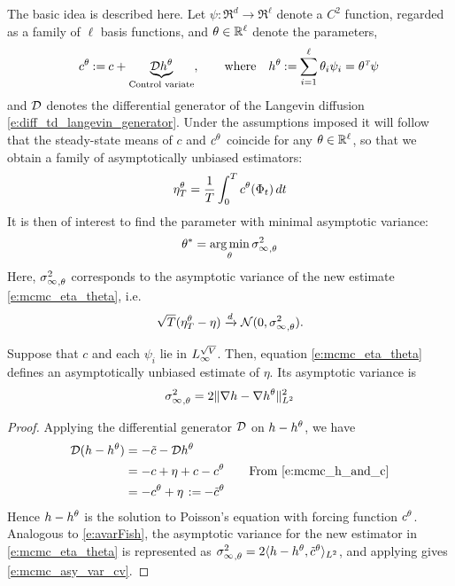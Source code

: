 The basic idea is described here. Let $\psi\colon\Re^d\to\Re^\ell$ denote a $C^2$ function, regarded as a family of $\ell$ basis functions, and $\theta\in\mathbb{R}^\ell$ denote the parameters,
\begin{equation}
\begin{aligned}
c^\param  \eqdef c + \underbrace{\generate h^\param}_{\text{Control variate}},
\qquad
\text{where}
\quad
h^\param  \eqdef  \sum_{i=1}^\ell \param_i \psi_i = \param^\transpose \psi\,
\end{aligned}
\label{e:mcmc_h_and_c}
\end{equation}
and ${\cal D}$ denotes the differential generator of the Langevin diffusion \eqref{e:diff_td_langevin_generator}. 
Under the assumptions imposed it will follow that the steady-state means of $c$ and $c^\theta$ coincide for any $\theta\in\mathbb{R}^\ell$,  so that we obtain a family of asymptotically unbiased estimators: %
\begin{equation}
\eta^\param_T =\frac{1}{T}\int_0^T c^\param(\markovstate_t)  \, dt
\label{e:mcmc_eta_theta}
\end{equation}
It is then of interest to find the parameter with minimal asymptotic variance:
\begin{equation}
\param^* = \argmin_\param {\asymvar}_{,\param}
\label{e:mcmc_theta_star}
\end{equation} 
Here, ${\sigma^2_\infty}_{,\theta}$ corresponds to the asymptotic variance of the new estimate \eqref{e:mcmc_eta_theta}, i.e.
\[
\sqrt{T} (\eta^\theta_T - \eta ) \xrightarrow[]{d} \mathcal{N} (0,{\sigma^2_\infty}_{,\theta}).
\]

\begin{proposition}
	\label{t:mcmc_say_var_cv}
	Suppose that  $c$ and each $\psi_i$ lie in $L_\infty^{\sqrt{V}}$. Then, equation \eqref{e:mcmc_eta_theta} defines an asymptotically unbiased estimate of $\eta$. Its asymptotic variance is
	\begin{equation}
	{\asymvar}_{,\param}
	= 2  \| \nabla  h - \nabla h^\param  \|^2_{L^2}
	\label{e:mcmc_asy_var_cv}
	\end{equation}
\end{proposition}

\begin{proof}
	Applying the differential generator ${\cal D}$ on $h - h^\theta$, we have
	\begin{equation}
	\begin{aligned}
	\generate ( h -h^\param) & = - \tilc - \generate h^\param\\
	& = - c + \eta + c - c^\param  \qquad \text{From \eqref{e:mcmc_h_and_c}} \\
	& = - c^\param + \eta\, \eqdef -\tilc^\param
	\end{aligned}	
	\label{e:mcmc_proof_i}
	\end{equation}
	Hence $h-h^\theta$ is the solution to Poisson's equation with forcing function $c^\theta$. Analogous to \eqref{e:avarFish}, the asymptotic variance for the new estimator in \eqref{e:mcmc_eta_theta} is represented as ${\sigma^2_\infty}_{,\theta} = 2 \langle h - h^\theta, \tilde c^\theta \rangle_{L^2}$, and applying  gives \eqref{e:mcmc_asy_var_cv}.
\end{proof}

